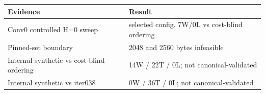 \begin{tabular}{ll}
\toprule
Evidence & Result \\
\midrule
Conv0 controlled H=0 sweep & selected config. 7W/0L vs cost-blind ordering \\
Pinned-set boundary & 2048 and 2560 bytes infeasible \\
Internal synthetic vs cost-blind ordering & 14W / 22T / 0L; not canonical-validated \\
Internal synthetic vs iter038 & 0W / 36T / 0L; not canonical-validated \\
\bottomrule
\end{tabular}
